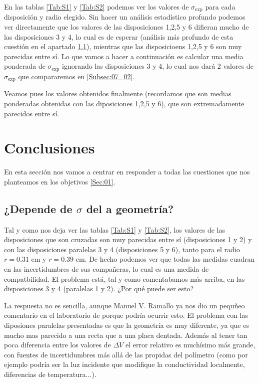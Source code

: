 \documentclass[11pt]{article}
\begin{document}



En las tablas \ref{Tab:S1} y \ref{Tab:S2} podemos ver los valores de $\sigma_{\exp}$ para cada disposición y radio elegido. Sin hacer un análisis estadístico profundo podemos ver directamente que los valores de las disposiciones 1,2,5 y 6 difieran mucho de las disposiciones 3 y 4, lo cual es de esperar (análisis más profundo de esta cuestión en el apartado \ref{Subsec:07_01}), mientras que las disposicioens 1,2,5 y 6 son muy parecidas entre sí. Lo que vamos a hacer a continuación es calcular una media ponderada \cite{Estadistica} de $\sigma_{\exp}$ ignorando las disposiciones 3 y 4, lo cual nos dará 2 valores de $\sigma_{\exp}$ que compararemos en \ref{Subsec:07_02}. 


Veamos pues los valores obtenidos finalmente (recordamos que son medias ponderadas obtenidas con las diposiciones 1,2,5 y 6), que son extremadamente parecidos entre sí. \\[1em]




\newpage

\section{Conclusiones}

En esta sección nos vamos a centrar en responder a todas las cuestiones que nos planteamos en los objetivos \ref{Sec:01}.

\subsection{¿Depende de $\sigma$ del a geometría?} \label{Subsec:07_01}

Tal y como nos deja ver las tablas \ref{Tab:S1} y \ref{Tab:S2}, los valores de las disposiciones que son cruzadas son muy parecidas entre sí (disposiciones 1 y 2) y con las disposiciones paralelas 3 y 4 (disposiciones 5 y 6), tanto para el radio $r=0.31$ cm y $r=0.39$ cm. De hecho podemos ver que todas las medidas cuadran en las incertidumbres de sus compañeras, lo cual es una medida de compatbilidad. El problema está, tal y como comentabamos más arriba, en las disposiciones 3 y 4 (paralelas 1 y 2). ¿Por qué puede ser esto?

La respuesta no es sencilla, aunque Manuel V. Ramallo ya nos dio un pequñeo comentario en el laboratorio de porque podría ocurrir esto. El problema con las diposiones paralelas presentadas es que la geometría es muy diferente, ya que es mucho mas parecido a una recta que a una placa dentada. Además al tener tan poca diferencia entre los valores de $\Delta V$ el error relativo es muchísimo más grande, con fuentes de incertidumbres más allá de las propidas del polímetro (como por ejemplo podría ser la luz incidente que modifique la conductividad localmente, diferencias de temperatura...). 
\end{document}
